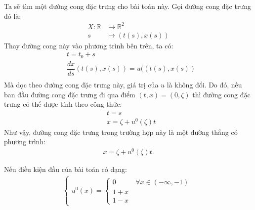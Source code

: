 \documentclass[DONG_CHAY_NEN_DUOC.tex]{subfiles}
\begin{document}
Ta sẽ tìm một đường cong đặc trưng cho bài toán này. Gọi đường cong đặc trưng đó là:
\begin{equation}
	\begin{aligned}
		X\colon\mathbb R&\longrightarrow\mathbb R^2\\
		s&\longmapsto (t(s),x(s))
	\end{aligned}
\end{equation}
Thay đường cong này vào phương trình bên trên, ta có:
\[
	\begin{aligned}
		& t = t_0+s\\
		& \dfrac{dx}{ds}\left(t(s),x(s)\right )=u(\left(t(s),x(s)\right)\\
	\end{aligned}
\]
Mà dọc theo đường cong đặc trưng này, giá trị của $u$ là không đổi. Do đó, nếu ban đầu đường cong đặc trưng đi qua điểm $(t,x)=(0,\zeta)$ thì đường cong đặc trưng có thể được tính theo công thức:
\[
\begin{aligned}
	& t = s\\
	& x = \zeta + u^0(\zeta)t
\end{aligned}
\]
Như vậy, đường cong đặc trưng trong trường hợp này là một đường thẳng có phương trình:
\[
	\begin{aligned}
		\boxed{x = \zeta + u^0(\zeta)t}.
	\end{aligned}
\]

Nếu điều kiện đầu của bài toán có dạng:
\begin{align}
	\begin{cases}
		u^0(x)=\begin{cases}
			0 &\ \forall x\in(-\infty,-1)\\
			1+x\\
			1-x			
		\end{cases}
	\end{cases}
\end{align}
\end{document}
